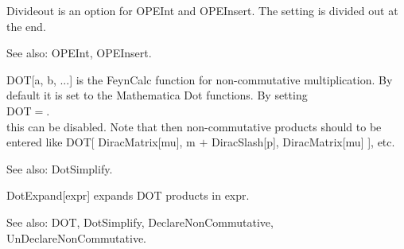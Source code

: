 

Divideout is an option for OPEInt and OPEInsert. The setting is divided out at the end.

See also: OPEInt, OPEInsert.



DOT[a, b, ...] is the FeynCalc function for non-commutative multiplication. By default it is set to the Mathematica Dot functions. By
  setting\\
DOT\(=\).\\
this can be disabled. Note that then non-commutative products should to be entered like DOT[ DiracMatrix[mu], m \(+\) DiracSlash[p],
  DiracMatrix[mu] ], etc.

See also: DotSimplify.



DotExpand[expr] expands DOT products in expr.

See also: DOT, DotSimplify, DeclareNonCommutative, UnDeclareNonCommutative.










